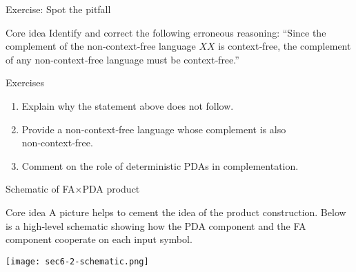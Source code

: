 \begin{frame}[t]{Exercise: Spot the pitfall}
  \begin{tblock}{Core idea}
    Identify and correct the following erroneous reasoning: “Since the
    complement of the non‑context‑free language $XX$ is context‑free,
    the complement of any non‑context‑free language must be context‑free.”
  \end{tblock}
  \begin{tblock}{Exercises}
    \begin{enumerate}
      \item Explain why the statement above does not follow.
      \item Provide a non‑context‑free language whose complement is also
        non‑context‑free.
      \item Comment on the role of deterministic PDAs in complementation.
    \end{enumerate}
  \end{tblock}
  \label{fr:6.2-23}
\end{frame}

\begin{frame}[t]{Schematic of FA×PDA product}
  \begin{tblock}{Core idea}
    A picture helps to cement the idea of the product construction.
    Below is a high‑level schematic showing how the PDA component and
    the FA component cooperate on each input symbol.
  \end{tblock}
  \begin{center}
    \texttt{[image: sec6-2-schematic.png]} %
  \end{center}
  \label{fr:6.2-24}
\end{frame}

